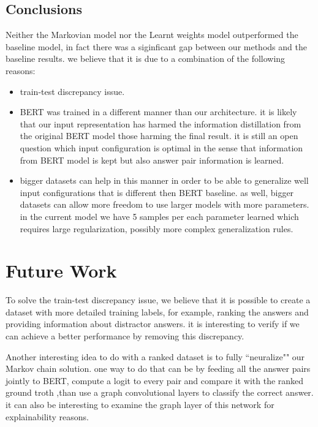 \documentclass{article}
\begin{document}
\subsection{Conclusions}
Neither the Markovian model nor the Learnt weights model outperformed the baseline model, in fact there was a siginficant gap between our methods and the baseline results. we believe that it is due to a combination of the following reasons:
\begin{itemize}
\item train-test discrepancy issue.
\item BERT was trained in a different manner than our architecture. it is likely  that our input representation has harmed the information distillation from the original BERT model those harming the final result. it is still an open question which input configuration is optimal in the sense that information from BERT model is kept but also answer pair information is learned. 
\item  bigger datasets can help in this manner in order to be able to generalize well input configurations that is different then BERT baseline. as well, bigger datasets  can allow more freedom to use larger models with more parameters. in the current model we have 5 samples per each parameter learned which requires large regularization, possibly more complex generalization rules.
\end{itemize}

\section{Future Work}
To solve the train-test discrepancy issue, we believe that it is possible to create a dataset with more detailed training labels, for example, ranking the answers and providing information about distractor answers. it is interesting to verify if we can achieve a better performance by removing this discrepancy.

Another interesting idea to do with a ranked dataset is to fully ``neuralize"" our Markov chain solution. one way to do that can be by feeding all the answer pairs jointly to  BERT, compute a logit to every pair and compare it with the ranked ground troth ,than use a graph convolutional layers to classify the correct answer. it can also be interesting to examine the graph layer of this network for explainability reasons.  

\nocite{langley00}






\end{document}
